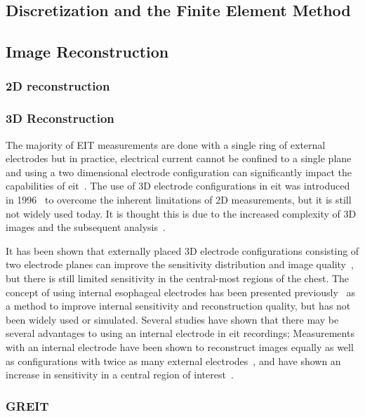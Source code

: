 \subsection{Discretization and the Finite Element Method}

\subsection{Image Reconstruction}

\subsubsection{2D reconstruction}

\subsubsection{3D Reconstruction}
The majority of EIT measurements are done with a single ring of external electrodes but 
in practice, electrical current cannot  be confined to a single plane
and using a two dimensional electrode configuration can significantly
impact the capabilities of \acrshort{eit}~\parencite{Rabbani1991}.
The use of 3D electrode configurations in \acrshort{eit}
was introduced in 1996~\parencite{Metherall1996} to overcome the 
inherent limitations of 2D measurements, but it is still not widely used today.
It is thought this is due to the increased complexity of 3D images
and the subsequent analysis~\parencite{Grychtol2019}.

It has been shown that externally placed 3D electrode configurations
consisting of two electrode planes
can improve the sensitivity distribution and image quality~\parencite{Grychtol2016},
but there is still limited sensitivity in the central-most regions 
of the chest.
The concept of using internal esophageal electrodes has been presented
previously~\parencite{Pilkington1989,Schuessler1995}
as a method to improve internal sensitivity 
and reconstruction quality,
but has not been widely used or simulated.
Several studies have shown that there may be several advantages to using an internal
electrode in \acrshort{eit} recordings; 
Measurements with an internal electrode have been 
shown to reconstruct images equally as well as configurations with 
twice as many external electrodes~\parencite{Schuessler1995},
and have shown an increase in sensitivity in a central region 
of interest~\parencite{Kwon2013,Czaplik2014,Farooq2014}.

\subsubsection{GREIT}

